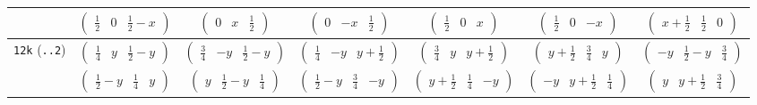 \documentclass[fleqn,9pt,landscape]{jsarticle}
\begin{document}
\begin{center}
\begin{longtable}{ccccccc}
& $ \begin{pmatrix} \frac{1}{2} & 0 & \frac{1}{2} - x \end{pmatrix} $ & $ \begin{pmatrix} 0 & x & \frac{1}{2} \end{pmatrix} $ & $ \begin{pmatrix} 0 & - x & \frac{1}{2} \end{pmatrix} $ & $ \begin{pmatrix} \frac{1}{2} & 0 & x \end{pmatrix} $ & $ \begin{pmatrix} \frac{1}{2} & 0 & - x \end{pmatrix} $ & $ \begin{pmatrix} x + \frac{1}{2} & \frac{1}{2} & 0 \end{pmatrix} $ \\ \hline
{\tt 12k} ({\tt ..2}) & $ \begin{pmatrix} \frac{1}{4} & y & \frac{1}{2} - y \end{pmatrix} $ & $ \begin{pmatrix} \frac{3}{4} & - y & \frac{1}{2} - y \end{pmatrix} $ & $ \begin{pmatrix} \frac{1}{4} & - y & y + \frac{1}{2} \end{pmatrix} $ & $ \begin{pmatrix} \frac{3}{4} & y & y + \frac{1}{2} \end{pmatrix} $ & $ \begin{pmatrix} y + \frac{1}{2} & \frac{3}{4} & y \end{pmatrix} $ & $ \begin{pmatrix} - y & \frac{1}{2} - y & \frac{3}{4} \end{pmatrix} $ \\
& $ \begin{pmatrix} \frac{1}{2} - y & \frac{1}{4} & y \end{pmatrix} $ & $ \begin{pmatrix} y & \frac{1}{2} - y & \frac{1}{4} \end{pmatrix} $ & $ \begin{pmatrix} \frac{1}{2} - y & \frac{3}{4} & - y \end{pmatrix} $ & $ \begin{pmatrix} y + \frac{1}{2} & \frac{1}{4} & - y \end{pmatrix} $ & $ \begin{pmatrix} - y & y + \frac{1}{2} & \frac{1}{4} \end{pmatrix} $ & $ \begin{pmatrix} y & y + \frac{1}{2} & \frac{3}{4} \end{pmatrix} $ \\ \hline

\end{longtable}
\end{center}
\end{document}
